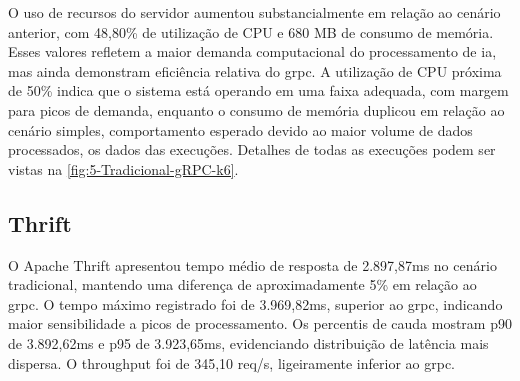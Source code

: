 O uso de recursos do servidor aumentou substancialmente em relação ao cenário anterior, com 48,80\% de utilização de CPU e 680 MB de consumo de memória. Esses valores refletem a maior demanda computacional do processamento de \gls{ia}, mas ainda demonstram eficiência relativa do \gls{grpc}. A utilização de CPU próxima de 50\% indica que o sistema está operando em uma faixa adequada, com margem para picos de demanda, enquanto o consumo de memória duplicou em relação ao cenário simples, comportamento esperado devido ao maior volume de dados processados, os dados das execuções. Detalhes de todas as execuções podem ser vistas na  \autoref{fig:5-Tradicional-gRPC-k6}.

\subsection{Thrift}

O Apache Thrift apresentou tempo médio de resposta de 2.897,87ms no cenário tradicional, mantendo uma diferença de aproximadamente 5\% em relação ao \gls{grpc}. O tempo máximo registrado foi de 3.969,82ms, superior ao \gls{grpc}, indicando maior sensibilidade a picos de processamento. Os percentis de cauda mostram p90 de 3.892,62ms e p95 de 3.923,65ms, evidenciando distribuição de latência mais dispersa. O throughput foi de 345,10 req/s, ligeiramente inferior ao \gls{grpc}.

\begin{table}[H]
\centering
\caption{Thrift comparado com os demais protocolos — Cenário Tradicional (\acrshort{grpc}/\gls{rest} em $\Delta$\% vs Thrift)}
\label{tab:5-res-tradicional-thrift}
\end{table}

